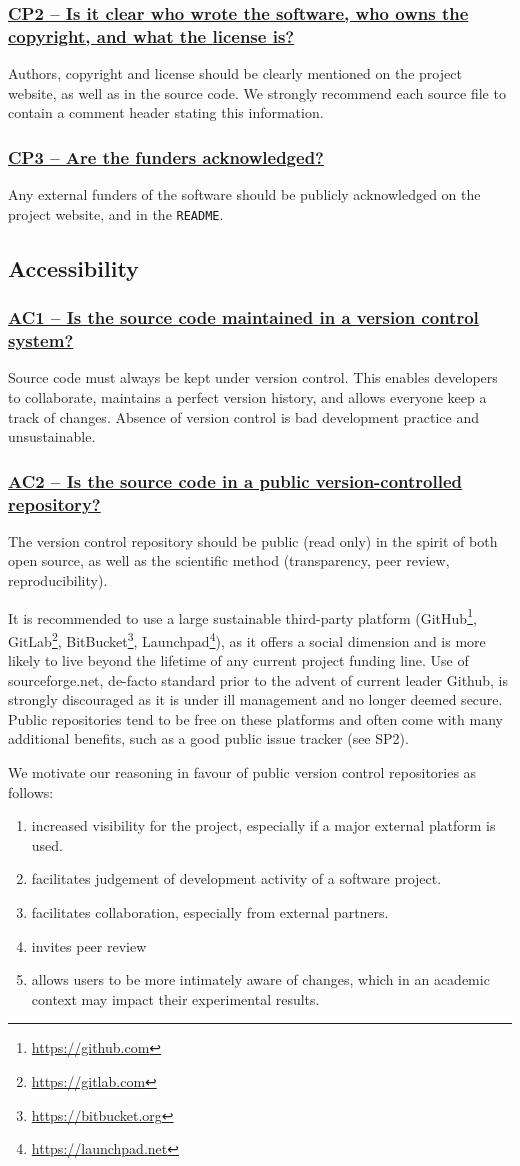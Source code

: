 \documentclass[a4paper,11pt]{article}
\newcommand{\indicator}[1]{\subsubsection*{\underline{#1}}}
\begin{document}
\indicator{CP2 -- Is it clear who wrote the software, who owns the
copyright, and what the license is?}

Authors, copyright and license should be clearly mentioned on the project
website, as well as in the source code.  We strongly recommend each source file
to contain a comment header stating this information.

\indicator{CP3 -- Are the funders acknowledged?}

Any external funders of the software should be publicly acknowledged on the project
website, and in the \texttt{README}.

\subsection{Accessibility}

\indicator{AC1 -- Is the source code maintained in a version control system?}

Source code must always be kept under version control. This enables developers
to collaborate, maintains a perfect version history, and allows everyone keep a
track of changes. Absence of version control is bad development practice and
unsustainable.

\indicator{AC2 -- Is the source code in a public version-controlled repository?}

The version control repository should be public (read only) in the spirit of both open
source, as well as the scientific method (transparency, peer review,
reproducibility). 

It is recommended to use a large sustainable third-party platform
(GitHub\footnote{\url{https://github.com}},
GitLab\footnote{\url{https://gitlab.com}},
BitBucket\footnote{\url{https://bitbucket.org}},
Launchpad\footnote{\url{https://launchpad.net}}), as it offers a social
dimension and is more likely to live beyond the lifetime of any current project
funding line. Use of sourceforge.net, de-facto standard prior to the advent of
current leader Github, is strongly discouraged as it is under ill management
and no longer deemed secure. Public repositories tend to be free on these platforms and
often come with many additional benefits, such as a good public issue tracker
(see SP2).

We motivate our reasoning in favour of public version control repositories as follows:

\begin{enumerate}
    \item increased visibility for the project, especially if a major external platform is used.
    \item facilitates judgement of development activity of a software project.
    \item facilitates collaboration, especially from external partners.
    \item invites peer review
    \item allows users to be more intimately aware of changes, which in an
        academic context may impact their experimental results.
\end{enumerate}
\end{document}
